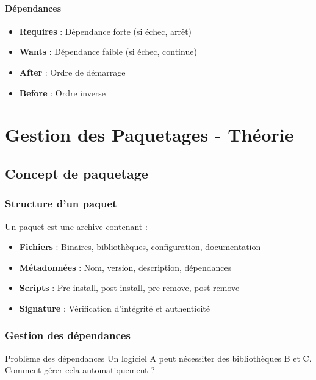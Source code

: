 \documentclass[12pt,a4paper]{article}
\begin{document}
\paragraph{Dépendances}
\begin{itemize}
    \item \textbf{Requires} : Dépendance forte (si échec, arrêt)
    \item \textbf{Wants} : Dépendance faible (si échec, continue)
    \item \textbf{After} : Ordre de démarrage
    \item \textbf{Before} : Ordre inverse
\end{itemize}


\section{Gestion des Paquetages - Théorie}

\subsection{Concept de paquetage}

\subsubsection{Structure d'un paquet}

Un paquet est une archive contenant :
\begin{itemize}
    \item \textbf{Fichiers} : Binaires, bibliothèques, configuration, documentation
    \item \textbf{Métadonnées} : Nom, version, description, dépendances
    \item \textbf{Scripts} : Pre-install, post-install, pre-remove, post-remove
    \item \textbf{Signature} : Vérification d'intégrité et authenticité
\end{itemize}

\subsubsection{Gestion des dépendances}

\begin{infobox}{Problème des dépendances}
Un logiciel A peut nécessiter des bibliothèques B et C. Comment gérer cela automatiquement ?
\end{infobox}
\end{document}
